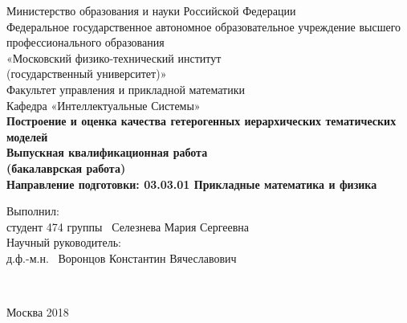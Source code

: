 \begin{titlepage}
{
\renewcommand{\baselinestretch}{1}
\thispagestyle{empty}
\begin{center}
    \sc
        Министерство образования и науки Российской Федерации\\
        \bigskip
        Федеральное государственное автономное образовательное учреждение высшего профессионального образования \\
        «Московский физико-технический институт \\
{\rm(государственный университет)}»\\
		\bigskip
        Факультет управления и прикладной математики\\
        \bigskip
        Кафедра «Интеллектуальные Системы»\\[35mm]
    \bf\Large
        Построение и оценка качества гетерогенных иерархических
		тематических моделей \\[5mm]
    \bigskip
    \rm\normalsize
    	Выпускная квалификационная работа\\
    	 (бакалаврская работа)\\
  	\bigskip
    \rm\normalsize
       Направление подготовки: 03.03.01 Прикладные математика и физика\\[10mm]
        
       \begin{flushleft}
       Выполнил:\\
студент 474 группы \underline{\hspace{2.0in}} \, Селезнева Мария Сергеевна\\[5mm]


Научный руководитель:\\
д.ф.-м.н.  \hspace{0.85in} \underline{\hspace{2.0in}} \, Воронцов Константин Вячеславович\\[35mm]

		\end{flushleft}
\end{center}

\


\begin{center}
    Москва 2018
\end{center}
}
\end{titlepage}
